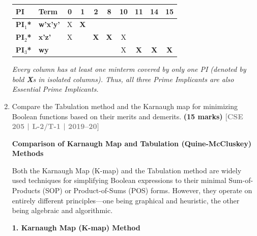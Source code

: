 \documentclass[12pt,a3paper]{article}
\newcommand{\yr}[1]{\hfill\textcolor{gray}{\small\textbf{[#1]}}}
\newcommand{\mk}[1]{\textcolor{orange!70!black}{\small\textbf{(#1 marks)}}}
\begin{document}
\begin{enumerate}
\begin{tcolorbox}[enhanced,breakable,ansbox,colback=cC!4,colframe=cC,boxrule=0.8pt,arc=5pt,title={\textbf{Answer}},fonttitle=\bfseries\color{white},colbacktitle=cC]
\begin{center}
\renewcommand{\arraystretch}{1.2}
\begin{tabular}{llcccccccc}
\toprule
\textbf{PI} & \textbf{Term} & \textbf{0} & \textbf{1} & \textbf{2} & \textbf{8} & \textbf{10} & \textbf{11} & \textbf{14} & \textbf{15} \\
\midrule
\rowcolor{cC!10}
\textbf{PI$_1$*} & \textbf{w'x'y'} & X & \textbf{X} & & & & & & \\
\rowcolor{cC!10}
\textbf{PI$_2$*} & \textbf{x'z'} & X & & \textbf{X} & \textbf{X} & X & & & \\
\rowcolor{cC!10}
\textbf{PI$_3$*} & \textbf{wy} & & & & & X & \textbf{X} & \textbf{X} & \textbf{X} \\
\bottomrule
\end{tabular}
\end{center}
\textit{Every column has at least one minterm covered by only one PI (denoted by bold \textbf{X}s in isolated columns). Thus, all three Prime Implicants are also Essential Prime Implicants.}

\begin{center}
\end{center}

\end{tcolorbox}

\item Compare the Tabulation method and the Karnaugh map for minimizing Boolean functions based on their merits and demerits.
\mk{15} \yr{CSE 205 | L-2/T-1 | 2019--20}

\begin{tcolorbox}[enhanced,breakable,ansbox,colback=cC!4,colframe=cC,boxrule=0.8pt,arc=5pt,title={\textbf{Answer}},fonttitle=\bfseries\color{white},colbacktitle=cC]

\textbf{\large Comparison of Karnaugh Map and Tabulation (Quine-McCluskey) Methods}

Both the Karnaugh Map (K-map) and the Tabulation method are widely used techniques for simplifying Boolean expressions to their minimal Sum-of-Products (SOP) or Product-of-Sums (POS) forms. However, they operate on entirely different principles—one being graphical and heuristic, the other being algebraic and algorithmic.

\vspace{1em}
\textbf{\large 1. Karnaugh Map (K-map) Method}


\end{tcolorbox}
\end{enumerate}
\end{document}
